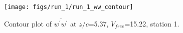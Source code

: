 \begin{figure}[H]
\centering
\texttt{[image: figs/run\_1/run\_1\_ww\_contour]}
\caption{Contour plot of $\overline{w^\prime w^\prime}$ at $z/c$=5.37, $V_{free}$=15.22, station 1.}
\label{fig:run_1_ww_contour}
\end{figure}


